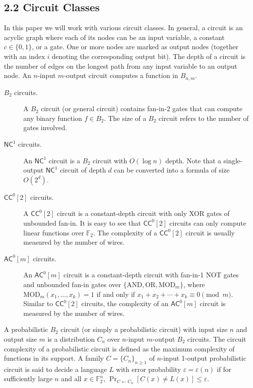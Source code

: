 \documentclass[10pt,a4paper]{article}
\begin{document}
\subsection*{2.2 Circuit Classes}
In this paper we will work with various circuit classes. In general, a circuit is an acyclic graph where each of its nodes can be an input variable, a constant $c\in\{0,1\}$, or a gate. One or more nodes are marked as output nodes (together with an index $i$ denoting the corresponding output bit). The depth of a circuit is the number of edges on the longest path from any input variable to an output node. An $n$-input $m$-output circuit computes a function in $B_{n,m}$.
\begin{description}
\item[{$B_2$ circuits.}] A $B_2$ circuit (or general circuit) contains fan-in-2 gates that can compute any binary function $f\in B_2$. The size of a $B_2$ circuit refers to the number of gates involved.
\item[{$\mathsf{NC}^1$ circuits.}] An $\mathsf{NC}^1$ circuit is a $B_2$ circuit with $O(\log n)$ depth. Note that a single-output $\mathsf{NC}^1$ circuit of depth $d$ can be converted into a formula of size $O(2^d)$.
\item[{$\mathsf{CC}^0[2]$ circuits.}] A $\mathsf{CC}^0[2]$ circuit is a constant-depth circuit with only XOR gates of unbounded fan-in. It is easy to see that $\mathsf{CC}^0[2]$ circuits can only compute linear functions over $\mathbb F_2$. The complexity of a $\mathsf{CC}^0[2]$ circuit is usually measured by the number of wires.
\item[{$\mathsf{AC}^0[m]$ circuits.}] An $\mathsf{AC}^0[m]$ circuit is a constant-depth circuit with fan-in-1 NOT gates and unbounded fan-in gates over $\{\mathrm{AND},\mathrm{OR},\mathrm{MOD}_m\}$, where $\mathrm{MOD}_m(x_1,\ldots,x_k)=1$ if and only if $x_1+x_2+\cdots+x_k\equiv0\pmod m$. Similar to $\mathsf{CC}^0[2]$ circuits, the complexity of an $\mathsf{AC}^0[m]$ circuit is measured by the number of wires.
\end{description}
A probabilistic $B_2$ circuit (or simply a probabilistic circuit) with input size $n$ and output size $m$ is a distribution $C_n$ over $n$-input $m$-output $B_2$ circuits. The circuit complexity of a probabilistic circuit is defined as the maximum complexity of functions in its support. A family $C=\{C_n\}_{n\ge1}$ of $n$-input 1-output probabilistic circuit is said to decide a language $L$ with error probability $\varepsilon=\varepsilon(n)$ if for sufficiently large $n$ and all $x\in\mathbb F_2^n$, $\Pr_{C\leftarrow C_n}[C(x)\ne L(x)]\le\varepsilon$.
\end{document}
